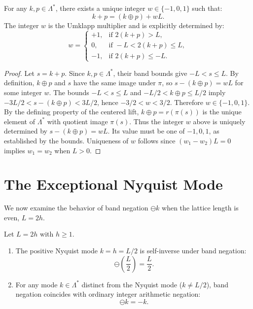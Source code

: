 \begin{theorem}
\label{thm:wrap_lemma}
For any $k, p \in \Lambda^*$, there exists a unique integer $w \in \{-1, 0, 1\}$ such that:
\begin{equation}
k + p = (k \oplus p) + w L.
\end{equation}
The integer $w$ is the Umklapp multiplier and is explicitly determined by:
\begin{equation}
w = \begin{cases}
+1, & \text{if } 2(k+p) > L, \\
0, & \text{if } -L < 2(k+p) \le L, \\
-1, & \text{if } 2(k+p) \le -L.
\end{cases}
\end{equation}
\end{theorem}

\begin{proof}
Let $s=k+p$. Since $k,p\in\Lambda^*$, their band bounds give $-L<s\le L$. By definition, $k\oplus p$ and $s$ have the same image under $\pi$, so $s-(k\oplus p)=wL$ for some integer $w$. The bounds $-L<s\le L$ and $-L/2<k\oplus p\le L/2$ imply $-3L/2<s-(k\oplus p)<3L/2$, hence $-3/2<w<3/2$. Therefore $w\in\{-1,0,1\}$.
By the defining property of the centered lift, $k\oplus p=r(\pi(s))$ is the unique element of $\Lambda^*$ with quotient image $\pi(s)$. Thus the integer $w$ above is uniquely determined by $s-(k\oplus p)=wL$. Its value must be one of $-1,0,1$, as established by the bounds.
Uniqueness of $w$ follows since $(w_1 - w_2) L = 0$ implies $w_1 = w_2$ when $L > 0$.
\end{proof}

\section{The Exceptional Nyquist Mode}

We now examine the behavior of band negation $\ominus k$ when the lattice length is even, $L = 2h$.

\begin{theorem}
\label{thm:nyquist_neg}
Let $L = 2h$ with $h \ge 1$.
\begin{enumerate}
    \item The positive Nyquist mode $k = h = L/2$ is self-inverse under band negation:
    \begin{equation}
    \ominus \left(\frac{L}{2}\right) = \frac{L}{2}.
    \end{equation}
    \item For any mode $k \in \Lambda^*$ distinct from the Nyquist mode ($k \neq L/2$), band negation coincides with ordinary integer arithmetic negation:
    \begin{equation}
    \ominus k = -k.
    \end{equation}
\end{enumerate}
\end{theorem}

